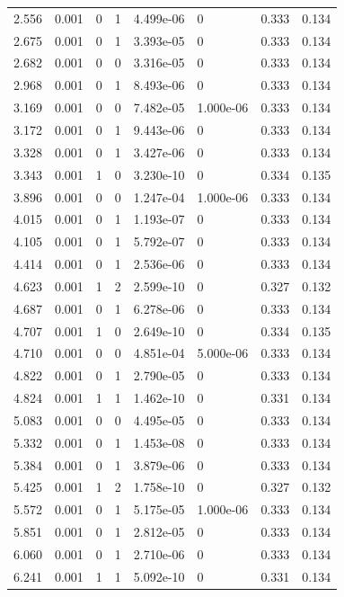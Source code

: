 \documentclass[preview]{standalone}
\begin{document}
{{\begin{tabular}{L{1.2cm}C{1.2cm} C{0.3cm}C{0.5cm} C{1.4cm}C{1.4cm} C{1.4cm}C{1.4cm}}
  2.556  &  0.001  & 0     &  1 &  4.499e-06  & 0  & 0.333 &  0.134   \\ 
  2.675  &  0.001  & 0     &  1 &  3.393e-05  & 0  & 0.333 &  0.134   \\ 
  2.682  &  0.001  & 0     &  0 &  3.316e-05  & 0  & 0.333 &  0.134   \\ 
  2.968  &  0.001  & 0     &  1 &  8.493e-06  & 0  & 0.333 &  0.134   \\ 
  3.169  &  0.001  & 0     &  0 &  7.482e-05  & 1.000e-06  & 0.333 &  0.134   \\ 
  3.172  &  0.001  & 0     &  1 &  9.443e-06  & 0  & 0.333 &  0.134   \\ 
  3.328  &  0.001  & 0     &  1 &  3.427e-06  & 0  & 0.333 &  0.134   \\ 
  3.343  &  0.001  & 1     &  0 &  3.230e-10  & 0  & 0.334 &  0.135   \\ 
  3.896  &  0.001  & 0     &  0 &  1.247e-04  & 1.000e-06  & 0.333 &  0.134   \\ 
  4.015  &  0.001  & 0     &  1 &  1.193e-07  & 0  & 0.333 &  0.134   \\ 
  4.105  &  0.001  & 0     &  1 &  5.792e-07  & 0  & 0.333 &  0.134   \\ 
  4.414  &  0.001  & 0     &  1 &  2.536e-06  & 0  & 0.333 &  0.134   \\ 
  4.623  &  0.001  & 1     &  2 &  2.599e-10  & 0  & 0.327 &  0.132   \\ 
  4.687  &  0.001  & 0     &  1 &  6.278e-06  & 0  & 0.333 &  0.134   \\ 
  4.707  &  0.001  & 1     &  0 &  2.649e-10  & 0  & 0.334 &  0.135   \\ 
  4.710  &  0.001  & 0     &  0 &  4.851e-04  & 5.000e-06  & 0.333 &  0.134   \\ 
  4.822  &  0.001  & 0     &  1 &  2.790e-05  & 0  & 0.333 &  0.134   \\ 
  4.824  &  0.001  & 1     &  1 &  1.462e-10  & 0  & 0.331 &  0.134   \\ 
  5.083  &  0.001  & 0     &  0 &  4.495e-05  & 0  & 0.333 &  0.134   \\ 
  5.332  &  0.001  & 0     &  1 &  1.453e-08  & 0  & 0.333 &  0.134   \\ 
  5.384  &  0.001  & 0     &  1 &  3.879e-06  & 0  & 0.333 &  0.134   \\ 
  5.425  &  0.001  & 1     &  2 &  1.758e-10  & 0  & 0.327 &  0.132   \\ 
  5.572  &  0.001  & 0     &  1 &  5.175e-05  & 1.000e-06  & 0.333 &  0.134   \\ 
  5.851  &  0.001  & 0     &  1 &  2.812e-05  & 0  & 0.333 &  0.134   \\ 
  6.060  &  0.001  & 0     &  1 &  2.710e-06  & 0  & 0.333 &  0.134   \\ 
  6.241  &  0.001  & 1     &  1 &  5.092e-10  & 0  & 0.331 &  0.134   \\ 
\hline 
\end{tabular} 

}}
\end{document}
